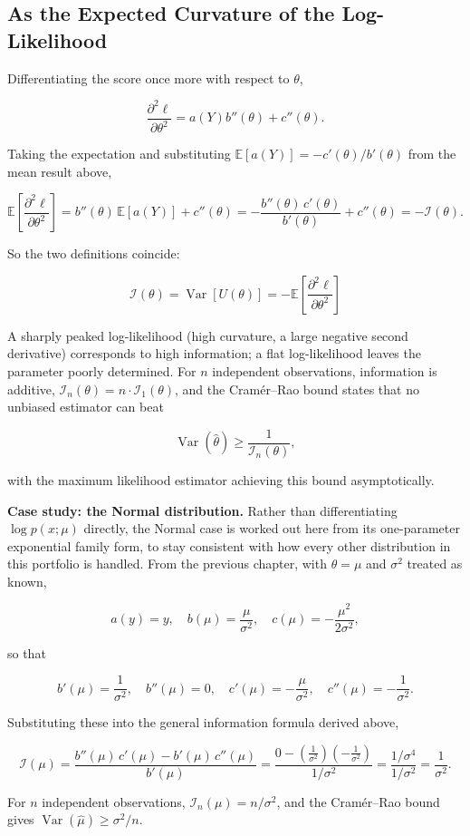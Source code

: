 \subsection*{As the Expected Curvature of the Log-Likelihood}
Differentiating the score once more with respect to $\theta$,
\begin{mathbox}
\[
\frac{\partial^2\ell}{\partial\theta^2} = a(Y)b''(\theta)+c''(\theta).
\]
\end{mathbox}
Taking the expectation and substituting $\mathbb{E}[a(Y)]=-c'(\theta)/b'(\theta)$ from the mean result above,
\begin{mathbox}
\[
\mathbb{E}\left[\frac{\partial^2\ell}{\partial\theta^2}\right] = b''(\theta)\,\mathbb{E}[a(Y)]+c''(\theta) = -\frac{b''(\theta)\,c'(\theta)}{b'(\theta)}+c''(\theta) = -\mathcal{I}(\theta).
\]
\end{mathbox}
So the two definitions coincide:
\begin{mathbox}
\[
\mathcal{I}(\theta) = \operatorname{Var}[U(\theta)] = -\mathbb{E}\left[\frac{\partial^2\ell}{\partial\theta^2}\right]
\]
\end{mathbox}
A sharply peaked log-likelihood (high curvature, a large negative second derivative) corresponds to high information; a flat log-likelihood leaves the parameter poorly determined. For $n$ independent observations, information is additive, $\mathcal{I}_n(\theta) = n\cdot\mathcal{I}_1(\theta)$, and the Cram\'er--Rao bound states that no unbiased estimator can beat
\begin{mathbox}
\[
\operatorname{Var}(\hat\theta) \geq \frac{1}{\mathcal{I}_n(\theta)},
\]
\end{mathbox}
with the maximum likelihood estimator achieving this bound asymptotically.

\Reflection
\tbc

\Application

\textbf{Case study: the Normal distribution.} Rather than differentiating $\log p(x;\mu)$ directly, the Normal case is worked out here from its one-parameter exponential family form, to stay consistent with how every other distribution in this portfolio is handled. From the previous chapter, with $\theta=\mu$ and $\sigma^2$ treated as known,
\begin{mathbox}
\[
a(y)=y,\quad b(\mu)=\frac{\mu}{\sigma^2},\quad c(\mu)=-\frac{\mu^2}{2\sigma^2},
\]
\end{mathbox}
so that
\begin{mathbox}
\[
b'(\mu)=\frac{1}{\sigma^2},\quad b''(\mu)=0,\quad c'(\mu)=-\frac{\mu}{\sigma^2},\quad c''(\mu)=-\frac{1}{\sigma^2}.
\]
\end{mathbox}
Substituting these into the general information formula derived above,
\begin{mathbox}
\[
\mathcal{I}(\mu) = \frac{b''(\mu)\,c'(\mu)-b'(\mu)\,c''(\mu)}{b'(\mu)} = \frac{0-\left(\frac{1}{\sigma^2}\right)\left(-\frac{1}{\sigma^2}\right)}{1/\sigma^2} = \frac{1/\sigma^4}{1/\sigma^2} = \frac{1}{\sigma^2}.
\]
\end{mathbox}
For $n$ independent observations, $\mathcal{I}_n(\mu)=n/\sigma^2$, and the Cram\'er--Rao bound gives $\operatorname{Var}(\hat\mu)\geq \sigma^2/n$.


